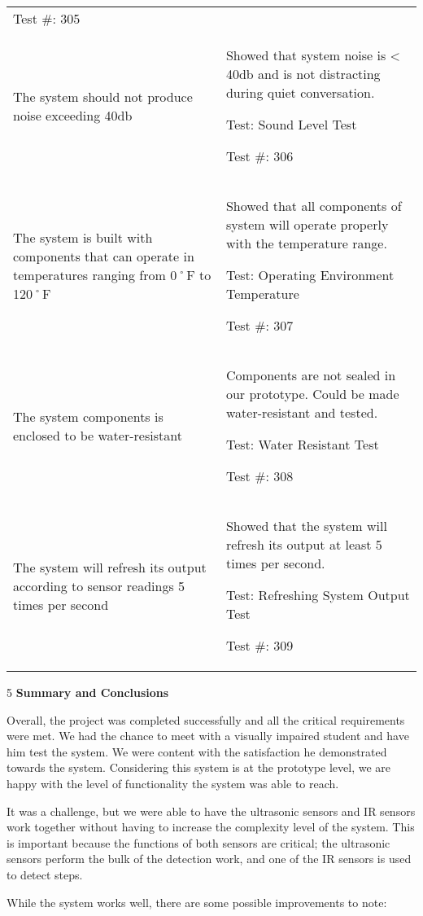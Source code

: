 \begin{longtable}[]{@{}
  >{\raggedright\arraybackslash}p{}
  >{\raggedright\arraybackslash}p{}@{}}
Test \#: 305 \\
The system should not produce noise exceeding 40db & Showed that system
noise is \textless{} 40db and is not distracting during quiet
conversation.

Test: Sound Level Test

Test \#: 306 \\
The system is built with components that can operate in temperatures
ranging from 0˚F to 120˚F & Showed that all components of system will
operate properly with the temperature range.

Test: Operating Environment Temperature

Test \#: 307 \\
The system components is enclosed to be water-resistant & Components are
not sealed in our prototype. Could be made water-resistant and tested.

Test: Water Resistant Test

Test \#: 308 \\
The system will refresh its output according to sensor readings 5 times
per second & Showed that the system will refresh its output at least 5
times per second.

Test: Refreshing System Output Test

Test \#: 309 \\
\end{longtable}

5 \textbf{Summary and Conclusions}

Overall, the project was completed successfully and all the critical
requirements were met. We had the chance to meet with a visually
impaired student and have him test the system. We were content with the
satisfaction he demonstrated towards the system. Considering this system
is at the prototype level, we are happy with the level of functionality
the system was able to reach.

It was a challenge, but we were able to have the ultrasonic sensors and
IR sensors work together without having to increase the complexity level
of the system. This is important because the functions of both sensors
are critical; the ultrasonic sensors perform the bulk of the detection
work, and one of the IR sensors is used to detect steps.

While the system works well, there are some possible improvements to
note:

